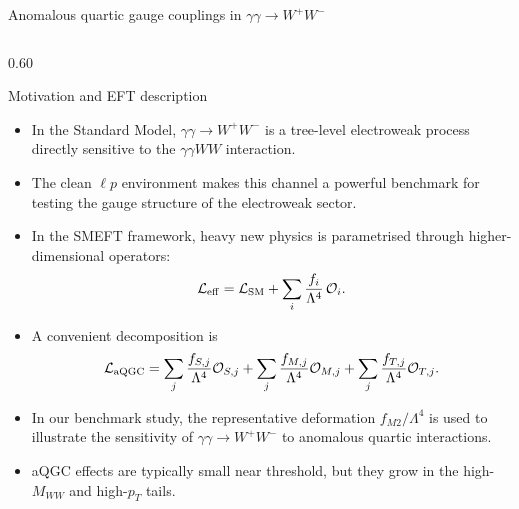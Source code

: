 \documentclass[aspectratio=1610,english]{beamer}
\begin{document}
\begin{frame}{Anomalous quartic gauge couplings in $\gamma\gamma\to W^+W^-$}
	
\begin{columns}%


\begin{column}{0.60\textwidth}


\begin{alertblock}{Motivation and EFT description}

\begin{itemize}
\tiny \justifying

\item In the Standard Model, $\gamma\gamma\to W^+W^-$ is a tree-level
electroweak process directly sensitive to the $\gamma\gamma WW$
interaction.

\item The clean $\ell p$ environment makes this channel a powerful
benchmark for testing the gauge structure of the electroweak sector.

\item In the SMEFT framework, heavy new physics is parametrised through
higher-dimensional operators:
\[
\mathcal{L}_{\rm eff}
=
\mathcal{L}_{\rm SM}
+
\sum_i \frac{f_i}{\Lambda^4}\,\mathcal{O}_i .
\]
\item A convenient decomposition is
\[
\mathcal{L}_{\rm aQGC}
=
\sum_j \frac{f_{S,j}}{\Lambda^4}\mathcal{O}_{S,j}
+
\sum_j \frac{f_{M,j}}{\Lambda^4}\mathcal{O}_{M,j}
+
\sum_j \frac{f_{T,j}}{\Lambda^4}\mathcal{O}_{T,j}.
\]
\item In our benchmark study, the representative deformation
\(f_{M2}/\Lambda^4\) is used to illustrate the sensitivity of
$\gamma\gamma\to W^+W^-$ to anomalous quartic interactions.

\item aQGC effects are typically small near threshold, but they grow in the 
high-\(M_{WW}\) and high-\(p_T\) tails.  

\end{itemize}
\end{alertblock}

\end{column}


\end{columns}
\end{frame}
\end{document}
